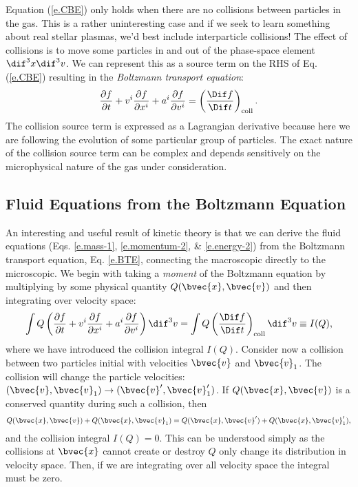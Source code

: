 Equation (\ref{e.CBE}) only holds when there are no collisions between particles in the gas.
This is a rather uninteresting case and if we seek to learn something about real stellar plasmas, we'd best include interparticle collisions!
The effect of collisions is to move some particles in and out of the phase-space element $\dif^3 x \dif^3 v$.
We can represent this as a source term on the RHS of Eq. (\ref{e.CBE}) resulting in the {\it Boltzmann transport equation}: 
\begin{equation}
  \frac{\partial f}{\partial t} + v^i\frac{\partial f}{\partial x^i} + a^i \frac{\partial f}{\partial v^i} = \left(\frac{\Dif f}{\Dif t}\right)_\mathrm{coll}. \label{e.BTE}
\end{equation}
The collision source term is expressed as a Lagrangian derivative because here we are following the evolution of some particular group of particles.
The exact nature of the collision source term can be complex and depends sensitively on the microphysical nature of the gas under consideration.

\subsection{Fluid Equations from the Boltzmann Equation}

An interesting and useful result of kinetic theory is that we can derive the fluid equations (Eqs. \ref{e.mass-1}, \ref{e.momentum-2}, \& \ref{e.energy-2})  from the Boltzmann transport equation, Eq. \ref{e.BTE}, connecting the macroscopic directly to the microscopic. We begin with taking a {\it moment} of the Boltzmann equation by multiplying by some physical quantity $Q(\bvec{x},\bvec{v})$ and then integrating over velocity space:
\begin{equation}
  \int Q \left(\frac{\partial f}{\partial t} + v^i\frac{\partial f}{\partial x^i} + a^i \frac{\partial f}{\partial v^i}\right) \dif^3v = \int Q \left(\frac{\Dif f}{\Dif t}\right)_\mathrm{coll} \dif^3v \equiv I(Q), \label{e.bte-mom-zero}
\end{equation}
where we have introduced the collision integral $I(Q)$. Consider now a collision between two particles initial with velocities $\bvec{v}$ and $\bvec{v}_1$. The collision will change the particle velocities: $(\bvec{v},\bvec{v}_1)\rightarrow(\bvec{v}^\prime,\bvec{v}_1^\prime)$. If $Q(\bvec{x},\bvec{v})$ is a conserved quantity during such a collision, then
\begin{equation}
  Q(\bvec{x},\bvec{v}) + Q(\bvec{x},\bvec{v}_1) = Q(\bvec{x},\bvec{v}^\prime) + Q(\bvec{x},\bvec{v}_1^\prime),
\end{equation}
and the collision integral $I(Q) = 0$.
This can be understood simply as the collisions at $\bvec{x}$ cannot create or destroy $Q$ only change its distribution in velocity space. Then, if we are integrating over all velocity space the integral must be zero.

